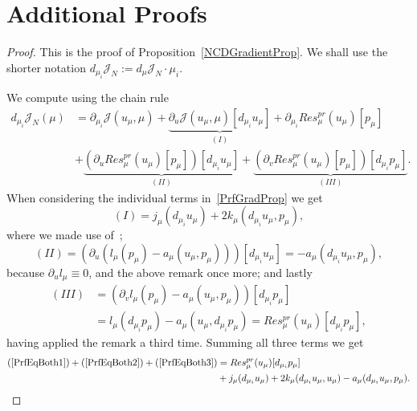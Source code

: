 \appendix

\section{Additional Proofs}\label{sec:Appendix}

\begin{proof}
    This is the proof of Proposition~\ref{NCDGradientProp}. We shall use the shorter notation $d_{\mu_i} \mathcal{J}_N := d_\mu \mathcal{J}_N \cdot \mu_i$.

    We compute using the chain rule
    \begin{align}
        d_{\mu_i} \mathcal{J}_N(\mu) &= \partial_{\mu_i} \mathcal{J}(u_\mu, \mu) + \underbrace{\partial_u \mathcal{J}(u_\mu, \mu)[d_{\mu_i} u_\mu]}_{(I)} + \partial_{\mu_i} Res_\mu^{pr}(u_\mu)[p_\mu] \label{PrfGradProp}\\
        &+ \underbrace{\left( \partial_u Res_\mu^{pr}(u_\mu)[p_\mu] \right)[d_{\mu_i} u_\mu]}_{(II)} + \underbrace{\left( \partial_v Res_\mu^{pr}(u_\mu)[p_\mu] \right)[d_{\mu_i} p_\mu]}_{(III)}. \nonumber
    \end{align}
    When considering the individual terms in~\eqref{PrfGradProp} we get
    \begin{equation}
        (I) = j_\mu(d_{\mu_i} u_\mu) + 2 k_\mu(d_{\mu_i} u_\mu, p_\mu),\label{PrfEqBoth1}
    \end{equation}
    where we made use of~\cite[Remark 2.4]{Keil2021};
    \begin{equation}
        (II) = \left( \partial_u (l_\mu(p_\mu) - a_\mu(u_\mu, p_\mu)) \right)[d_{\mu_i} u_\mu] = -a_\mu(d_{\mu_i} u_\mu, p_\mu),\label{PrfEqBoth2}
    \end{equation}
    because $\partial_u l_\mu \equiv 0$, and the above remark once more; and lastly
    \begin{align}
        (III) &= \left( \partial_v l_\mu(p_\mu) - a_\mu(u_\mu, p_\mu) \right)[d_{\mu_i} p_\mu] \label{PrfEqBoth3}\\
        &= l_\mu(d_{\mu_i} p_\mu) - a_\mu(u_\mu, d_{\mu_i} p_\mu) = Res_\mu^{pr}(u_\mu)[d_{\mu_i} p_\mu], \nonumber
    \end{align}
    having applied the remark a third time.
    Summing all three terms we get
    \begin{align}
        (\ref{PrfEqBoth1}) + (\ref{PrfEqBoth2}) + (\ref{PrfEqBoth3}) &= Res_\mu^{pr}(u_\mu)[d_{\mu_i} p_\mu] \label{PrfEq1}\\
        &+ j_\mu(d_{\mu_i} u_\mu) + 2 k_\mu(d_{\mu_i} u_\mu, u_\mu) - a_\mu(d_{\mu_i} u_\mu, p_\mu). \nonumber
    \end{align}


\end{proof}
